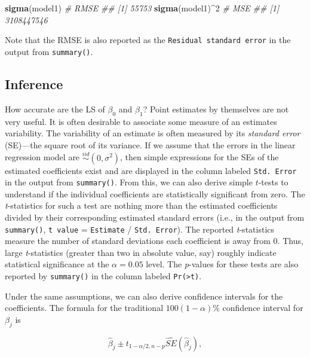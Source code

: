 \documentclass[]{krantz}
\makeatletter
\newenvironment{Shaded}{\begin{snugshade}}{\end{snugshade}}
\newcommand{\CommentTok}[1]{\textcolor[rgb]{0.37,0.37,0.37}{\textit{#1}}}
\newcommand{\DecValTok}[1]{\textcolor[rgb]{0.06,0.06,0.06}{#1}}
\newcommand{\KeywordTok}[1]{\textcolor[rgb]{0.27,0.27,0.27}{\textbf{#1}}}
\newcommand{\NormalTok}[1]{#1}
\newcommand{\OperatorTok}[1]{\textcolor[rgb]{0.43,0.43,0.43}{\textbf{#1}}}
\newenvironment{kframe}{%
\medskip{}
\setlength{\fboxsep}{.8em}
 \def\at@end@of@kframe{}%
 \ifinner\ifhmode%
  \def\at@end@of@kframe{\end{minipage}}%
  \begin{minipage}{\columnwidth}%
 \fi\fi%
 \def\FrameCommand##1{\hskip\@totalleftmargin \hskip-\fboxsep
 \colorbox{shadecolor}{##1}\hskip-\fboxsep
     \hskip-\linewidth \hskip-\@totalleftmargin \hskip\columnwidth}%
 \MakeFramed {\advance\hsize-\width
   \@totalleftmargin\z@ \linewidth\hsize
   \@setminipage}}%
 {\par\unskip\endMakeFramed%
 \at@end@of@kframe}
\renewenvironment{Shaded}{\begin{kframe}}{\end{kframe}}
\makeatother
\begin{document}
\begin{Shaded}
\begin{Highlighting}[]
\KeywordTok{sigma}\NormalTok{(model1)    }\CommentTok{# RMSE}
\CommentTok{## [1] 55753}
\KeywordTok{sigma}\NormalTok{(model1)}\OperatorTok{^}\DecValTok{2}  \CommentTok{# MSE}
\CommentTok{## [1] 3108447546}
\end{Highlighting}
\end{Shaded}

Note that the RMSE is also reported as the \texttt{Residual\ standard\ error} in the output from \texttt{summary()}.

\hypertarget{inference}{%
\subsection{Inference}\label{inference}}

How accurate are the LS of \(\beta_0\) and \(\beta_1\)? Point estimates by themselves are not very useful. It is often desirable to associate some measure of an estimates variability. The variability of an estimate is often measured by its \emph{standard error} (SE)---the square root of its variance. If we assume that the errors in the linear regression model are \(\stackrel{iid}{\sim} \left(0, \sigma^2\right)\), then simple expressions for the SEs of the estimated coefficients exist and are displayed in the column labeled \texttt{Std.\ Error} in the output from \texttt{summary()}. From this, we can also derive simple \(t\)-tests to understand if the individual coefficients are statistically significant from zero. The \emph{t}-statistics for such a test are nothing more than the estimated coefficients divided by their corresponding estimated standard errors (i.e., in the output from \texttt{summary()}, \texttt{t\ value} = \texttt{Estimate} / \texttt{Std.\ Error}). The reported \emph{t}-statistics measure the number of standard deviations each coefficient is away from 0. Thus, large \emph{t}-statistics (greater than two in absolute value, say) roughly indicate statistical significance at the \(\alpha = 0.05\) level. The \emph{p}-values for these tests are also reported by \texttt{summary()} in the column labeled \texttt{Pr(\textgreater{}\textbar{}t\textbar{})}.

Under the same assumptions, we can also derive confidence intervals for the coefficients. The formula for the traditional \(100\left(1 - \alpha\right)\)\% confidence interval for \(\beta_j\) is

\begin{equation}
  \widehat{\beta}_j \pm t_{1 - \alpha / 2, n - p} \widehat{SE}\left(\widehat{\beta}_j\right),
  \label{eq:conf-int}
\end{equation}
\end{document}
